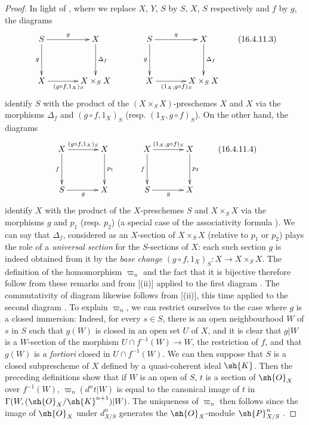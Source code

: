 \begin{proof}
In light of , where we replace $X$, $Y$, $S$ by $S$, $X$, $S$ respectively and $f$ by $g$, the diagrams
\[
  \label{IV.16.4.11.3}
  \xymatrix@=3pc{
    S \ar[r]^-g \ar[d]_-g &  X \ar[d]^-{\Delta_f} & S \ar[r]^-g  \ar[d]_-g & X \ar[d]^-{\Delta_f}  \\
    X \ar[r]_{(g\circ f, 1_X)_S} & X\times_S X & X \ar[r]_{(1_X, g\circ f)_S} & X \times_S X
  }
  \tag{16.4.11.3}
\]
identify $S$ with the product of the $(X \times_S X)$-preschemes $X$ and $X$ via the morphisms $\Delta_f$ and $(g\circ f, 1_X)_S$ (resp. $(1_X, g\circ f)_S$).
On the other hand, the diagrams
\[
  \label{IV.16.4.11.4}
  \xymatrix@=3pc{
    X \ar[r]^{(g\circ f, 1_X)_S} \ar[d]_-f &  X \ar[d]^-{p_1} &  X \ar[r]^{(1_X, g\circ f)_S} \ar[d]_-f &  X \ar[d]^-{p_2} \\
    S \ar[r]_{g} & X & S \ar[r]_{g} & X
  }
  \tag{16.4.11.4}
\]
identify $X$ with the product of the $X$-preschemes $S$ and $X \times_S X$ via the morphisms $g$ and $p_1$ (resp. $p_2$) (a special case of the associativity formula ).
We can say that $\Delta_f$, considered as an $X$-section of $X \times_S X$ (relative to $p_1$ or $p_2$) plays the role of a \emph{universal section} for the $S$-sections of $X$:
each such section $g$ is indeed obtained from it by the \emph{base change} $(g \circ f, 1_X)_S: X \to X \times_S X$.
The definition of the homomorphism $\varpi_n$ and the fact that it is bijective therefore follow from these remarks and from [(ii)] applied to the first diagram .
The commutativity of diagram  likewise follows from [(ii)], this time applied to the second diagram .
To explain $\varpi_n$, we can restrict ourselves to the case where $g$ is a closed immersion:
Indeed, for every $s \in S$, there is an open neighbourhood $W$ of $s$ in $S$ such that $g(W)$ is closed in an open set $U$ of $X$, and it is clear that $g|W$ is a $W$-section of the morphism $U \cap f^{-1}(W) \to W$, the restriction of $f$, and that $g(W)$ is \emph{a fortiori} closed in $U \cap f^{-1}(W)$.
We can then suppose that $S$ is a closed subprescheme of $X$ defined by a quasi-coherent ideal $\sh{K}$.
Then the preceding definitions show that if $W$ is an open of $S$, $t$ is a section of $\sh{O}_X$ over $f^{-1}(W)$, $\varpi_n(d^n t|W)$ is equal to the canonical image of $t$ in $\Gamma(W, (\sh{O}_X/\sh{K}^{n+1})|W)$. 
The uniqueness of $\varpi_n$ then follows since the image of $\sh{O}_X$ under $d_{X/S}^n$ generates the $\sh{O}_X$-module $\sh{P}_{X/S}^n$ .
\end{proof}

